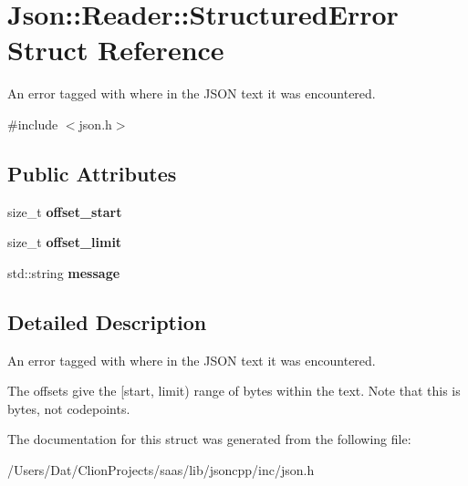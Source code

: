 \hypertarget{struct_json_1_1_reader_1_1_structured_error}{}\section{Json\+:\+:Reader\+:\+:Structured\+Error Struct Reference}
\label{struct_json_1_1_reader_1_1_structured_error}


An error tagged with where in the J\+S\+ON text it was encountered.  




{\ttfamily \#include $<$json.\+h$>$}

\subsection*{Public Attributes}
\begin{DoxyCompactItemize}
\item 
size\+\_\+t {\bfseries offset\+\_\+start}\hypertarget{struct_json_1_1_reader_1_1_structured_error_a160dae4eb3464a2209b743c755baf65f}{}\label{struct_json_1_1_reader_1_1_structured_error_a160dae4eb3464a2209b743c755baf65f}

\item 
size\+\_\+t {\bfseries offset\+\_\+limit}\hypertarget{struct_json_1_1_reader_1_1_structured_error_a80747dae744bcc80a9bc81c94fd42e13}{}\label{struct_json_1_1_reader_1_1_structured_error_a80747dae744bcc80a9bc81c94fd42e13}

\item 
std\+::string {\bfseries message}\hypertarget{struct_json_1_1_reader_1_1_structured_error_ab8755e5201b78c6ae077338f8819e6e6}{}\label{struct_json_1_1_reader_1_1_structured_error_ab8755e5201b78c6ae077338f8819e6e6}

\end{DoxyCompactItemize}


\subsection{Detailed Description}
An error tagged with where in the J\+S\+ON text it was encountered. 

The offsets give the \mbox{[}start, limit) range of bytes within the text. Note that this is bytes, not codepoints. 

The documentation for this struct was generated from the following file\+:\begin{DoxyCompactItemize}
\item 
/\+Users/\+Dat/\+Clion\+Projects/saas/lib/jsoncpp/inc/json.\+h\end{DoxyCompactItemize}
